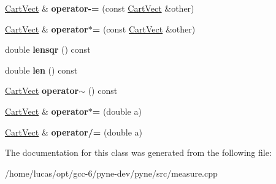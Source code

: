 \begin{DoxyCompactItemize}
\item 
\hyperlink{class_cart_vect}{Cart\+Vect} \& {\bfseries operator-\/=} (const \hyperlink{class_cart_vect}{Cart\+Vect} \&other)\hypertarget{class_cart_vect_a459252305cedf4e95a997bd46a26e9b8}{}\label{class_cart_vect_a459252305cedf4e95a997bd46a26e9b8}

\item 
\hyperlink{class_cart_vect}{Cart\+Vect} \& {\bfseries operator$\ast$=} (const \hyperlink{class_cart_vect}{Cart\+Vect} \&other)\hypertarget{class_cart_vect_ae4d813aaf367f7260870b051062a776f}{}\label{class_cart_vect_ae4d813aaf367f7260870b051062a776f}

\item 
double {\bfseries lensqr} () const \hypertarget{class_cart_vect_a9ab6e8cdf915cde3cf166a6c8c10ce17}{}\label{class_cart_vect_a9ab6e8cdf915cde3cf166a6c8c10ce17}

\item 
double {\bfseries len} () const \hypertarget{class_cart_vect_a4809574b9b0bc24075da36e5b60e6988}{}\label{class_cart_vect_a4809574b9b0bc24075da36e5b60e6988}

\item 
\hyperlink{class_cart_vect}{Cart\+Vect} {\bfseries operator$\sim$} () const \hypertarget{class_cart_vect_aeafa9899c84e5ed65f3217fc1217e7a2}{}\label{class_cart_vect_aeafa9899c84e5ed65f3217fc1217e7a2}

\item 
\hyperlink{class_cart_vect}{Cart\+Vect} \& {\bfseries operator$\ast$=} (double a)\hypertarget{class_cart_vect_a3dec977a311cf363e0ce7f2983370b10}{}\label{class_cart_vect_a3dec977a311cf363e0ce7f2983370b10}

\item 
\hyperlink{class_cart_vect}{Cart\+Vect} \& {\bfseries operator/=} (double a)\hypertarget{class_cart_vect_aaf0806de8642163882bc844e55fa921f}{}\label{class_cart_vect_aaf0806de8642163882bc844e55fa921f}

\end{DoxyCompactItemize}


The documentation for this class was generated from the following file\+:\begin{DoxyCompactItemize}
\item 
/home/lucas/opt/gcc-\/6/pyne-\/dev/pyne/src/measure.\+cpp\end{DoxyCompactItemize}
